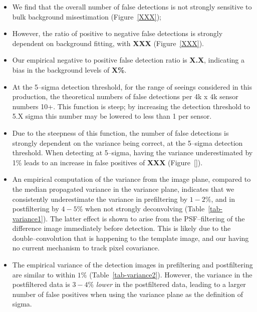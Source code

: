 \documentclass[prd, nofootinbib, floatfix, 11pt,tightenlines,times]{article}
\begin{document}
\begin{itemize}

\item We find that the overall number of false detections is not
  strongly sensitive to bulk background misestimation
  (Figure~\ref{XXX});

\item However, the ratio of positive to negative false detections is
  strongly dependent on background fitting, with {\bf XXX}
  (Figure~\ref{XXX}).

\item Our empirical negative to positive false detection ratio is {\bf
  X.X}, indicating a bias in the background levels of {\bf X\%}.

\item At the 5--sigma detection threshold, for the range of seeings
  considered in this production, the theoretical numbers of false
  detections per 4k x 4k sensor numbers 10+.  This function is steep;
  by increasing the detection threshold to 5.X sigma this number may
  be lowered to less than 1 per sensor.

\item Due to the steepness of this function, the number of false
  detections is strongly dependent on the variance being correct, at
  the 5--sigma detection threshold.  When detecting at 5--sigma,
  having the variance underestimated by 1\% leads to an increase
  in false positives of {\bf XXX} (Figure~\ref{}).

\item An empirical computation of the variance from the image plane,
  compared to the median propagated variance in the variance plane,
  indicates that we consistently underestimate the variance in
  prefiltering by $1-2\%$, and in postfiltering by $4-5\%$ when not
  strongly deconvolving (Table~\ref{tab-variance1}).  The latter
  effect is shown to arise from the PSF--filtering of the difference
  image immediately before detection.  This is likely due to the
  double--convolution that is happening to the template image, and our
  having no current mechanism to track pixel covariance.

\item The empirical variance of the detection images in prefiltering
  and postfiltering are similar to within $1\%$
  (Table~\ref{tab-variance2}).  However, the variance in the
  postfiltered data is $3-4\%$ {\it lower} in the postfiltered data,
  leading to a larger number of false positives when using the
  variance plane as the definition of sigma.


\end{itemize}
\end{document}
